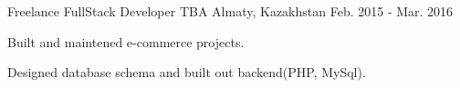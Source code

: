 \begin{cventries}
  \cventry
    {Freelance FullStack Developer} %
    {TBA} %
    {Almaty, Kazakhstan} %
    {Feb. 2015 - Mar. 2016} %
    {
      \begin{cvitems} %
        \item {Built and maintened e-commerce projects.}
        \item {Designed database schema and built out backend(PHP, MySql).}
      \end{cvitems}
    }

\end{cventries}
